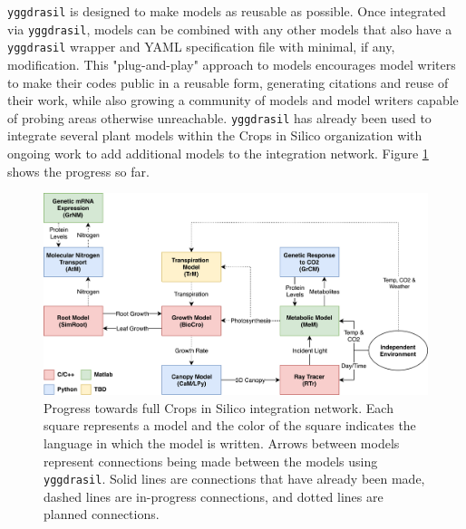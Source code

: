 \documentclass[journal]{IEEEtran}
\newcommand{\pkg}{{\tt yggdrasil}{}}
\begin{document}
{\pkg} is designed to make models as reusable as possible. Once integrated via {\pkg}, models can be combined with any other models that also have a {\pkg} wrapper and YAML specification file with minimal, if any, modification. This "plug-and-play" approach to models encourages model writers to make their codes public in a reusable form, generating citations and reuse of their work, while also growing a community of models and model writers capable of probing areas otherwise unreachable. 
%
{\pkg} has already been used to integrate several plant models within the Crops in Silico organization \citep{Marshall-Colon2017} with ongoing work to add additional models to the integration network. Figure \ref{fig:network} shows the progress so far. 
%
\ifinclfig
 	\begin{figure}[htbp]
	\begin{center}
	\includegraphics[width=\columnwidth,keepaspectratio]{./images/CiS-Languages.png}
	\caption{Progress towards full Crops in Silico integration network. Each square represents a model and the color of the square indicates the language in which the model is written. Arrows between models represent connections being made between the models using {\pkg}. Solid lines are connections that have already been made, dashed lines are in-progress connections, and dotted lines are planned connections.}
	\label{fig:network}
	\end{center}
	\end{figure}
\end{document}
